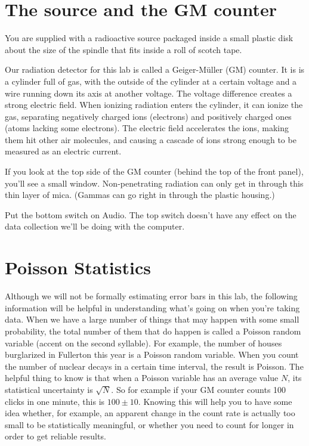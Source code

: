 \section*{The source and the GM counter}

You are supplied with a radioactive source packaged inside
a small plastic disk about the size of the spindle that
fits inside a roll of scotch tape.

Our radiation detector for this lab is called a Geiger-M\"{u}ller (GM) counter.
It is is a cylinder full of gas, with the outside
of the cylinder at a certain voltage and a wire running down
its axis at another voltage. The voltage difference creates
a strong electric field. When ionizing radiation enters
the cylinder, it can ionize the gas, separating negatively
charged ions (electrons) and positively charged ones
(atoms lacking some electrons). The electric field accelerates
the ions, making them hit other air molecules, and causing
a cascade of ions strong enough to be measured as an electric
current.

If you look at the top side of the GM counter (behind the top of the front panel),
you'll see a small window. Non-penetrating radiation can only get in through
this thin layer of mica. (Gammas can go right in through the plastic housing.)

Put the bottom switch on Audio. The top switch doesn't have any effect
on the data collection we'll be doing with the computer.

\section*{Poisson Statistics}
Although we will not be formally estimating error bars in this lab, the following
information will be helpful in understanding what's going on when you're taking
data. When we have a large number of things that may happen with some small
probability, the total number of them that do happen is called a Poisson random variable
(accent on the second syllable). For example, the number of houses burglarized in Fullerton
this year is a Poisson random variable. When you count the number of nuclear decays in
a certain time interval, the result is Poisson. The helpful thing to know is that when
a Poisson variable has an average value $N$, its statistical uncertainty is $\sqrt{N}$.
So for example if your GM counter counts 100 clicks in one minute, this is $100\pm10$.
Knowing this will help you to have some idea whether, for example, an apparent change
in the count rate is actually too small to be statistically meaningful, or whether you
need to count for longer in order to get reliable results.


